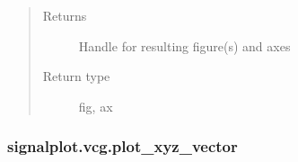 \documentclass[letterpaper,10pt,english]{sphinxmanual}
\begin{document}
\begin{fulllineitems}
\begin{quote}
\begin{description}
\begin{itemize}
\begin{description}
\end{description}


\end{itemize}

\item[{Returns}] \leavevmode
\sphinxAtStartPar
Handle for resulting figure(s) and axes

\item[{Return type}] \leavevmode
\sphinxAtStartPar
fig, ax

\end{description}\end{quote}

\end{fulllineitems}



\subsubsection{signalplot.vcg.plot\_xyz\_vector}
\label{\detokenize{_autosummary/signalplot.vcg.plot_xyz_vector:signalplot-vcg-plot-xyz-vector}}\label{\detokenize{_autosummary/signalplot.vcg.plot_xyz_vector::doc}}
\end{document}
